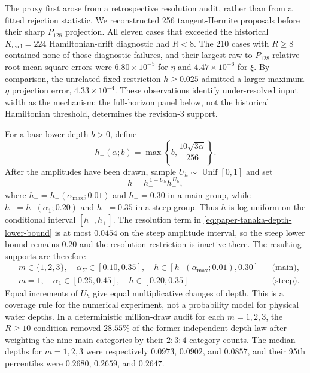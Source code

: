 The proxy first arose from a retrospective resolution audit, rather than from
a fitted rejection statistic.  We reconstructed 256 tangent-Hermite proposals
before their sharp $P_{128}$ projection.  All eleven cases that exceeded the
historical $K_{\mathrm{evol}}=224$ Hamiltonian-drift diagnostic had $R<8$.
The 210 cases with $R\geq8$ contained none of those diagnostic failures, and
their largest raw-to-$P_{128}$ relative root-mean-square errors were
$6.80\times10^{-5}$ for $\eta$ and $4.47\times10^{-6}$ for $\xi$.  By
comparison, the unrelated fixed restriction $h\geq0.025$ admitted a larger
maximum $\eta$ projection error, $4.33\times10^{-4}$.  These observations
identify under-resolved input width as the mechanism; the full-horizon panel
below, not the historical Hamiltonian threshold, determines the revision-3
support.

For a base lower depth $b>0$, define
\begin{equation}
  h_-(\alpha;b)
  =\max\!\left\{b,\frac{10\sqrt{3\alpha}}{256}\right\}.
  \label{eq:paper-tanaka-depth-lower-bound}
\end{equation}
After the amplitudes have been drawn, sample $U_h\sim\operatorname{Unif}[0,1]$
and set
\begin{equation}
  h=h_-^{\,1-U_h}h_+^{\,U_h},
  \label{eq:paper-tanaka-geometric-depth}
\end{equation}
where $h_-=h_-(\alpha_{\max};0.01)$ and $h_+=0.30$ in a main group, while
$h_-=h_-(\alpha_1;0.20)$ and $h_+=0.35$ in a steep group.  Thus $h$ is
log-uniform on the conditional interval $[h_-,h_+]$.  The resolution term in
\cref{eq:paper-tanaka-depth-lower-bound} is at most $0.0454$ on the steep
amplitude interval, so the steep lower bound remains $0.20$ and the
resolution restriction is inactive there.  The resulting supports are
therefore
\begin{align}
  &m\in\{1,2,3\},\quad
    \alpha_\Sigma\in[0.10,0.35],\quad
    h\in[h_-(\alpha_{\max};0.01),0.30]
    &&\text{(main)},
  \label{eq:paper-tanaka-main-support}\\
  &m=1,\quad
    \alpha_1\in[0.25,0.45],\quad
    h\in[0.20,0.35]
    &&\text{(steep)}.
  \label{eq:paper-tanaka-steep-support}
\end{align}
Equal increments of $U_h$ give equal multiplicative changes of depth.  This is
a coverage rule for the numerical experiment, not a probability model for
physical water depths.  In a deterministic million-draw audit for each
$m=1,2,3$, the $R\geq10$ condition removed $28.55\%$ of the former
independent-depth law after weighting the nine main categories by their
$2:3:4$ category counts.  The median depths for $m=1,2,3$ were respectively
$0.0973$, $0.0902$, and $0.0857$, and their 95th percentiles were $0.2680$,
$0.2659$, and $0.2647$.


